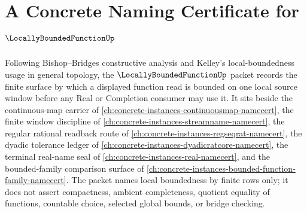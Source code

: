 \chapter{A Concrete Naming Certificate for $\LocallyBoundedFunctionUp$}
\label{ch:concrete-instances-locally-bounded-function-namecert}

Following Bishop--Bridges constructive analysis and Kelley's local-boundedness usage in general topology, the $\LocallyBoundedFunctionUp$ packet records the finite surface by which a displayed function read is bounded on one local source window before any Real or Completion consumer may use it. It sits beside the continuous-map carrier of \autoref{ch:concrete-instances-continuousmap-namecert}, the finite window discipline of \autoref{ch:concrete-instances-streamname-namecert}, the regular rational readback route of \autoref{ch:concrete-instances-regseqrat-namecert}, the dyadic tolerance ledger of \autoref{ch:concrete-instances-dyadicratcore-namecert}, the terminal real-name seal of \autoref{ch:concrete-instances-real-namecert}, and the bounded-family comparison surface of \autoref{ch:concrete-instances-bounded-function-family-namecert}. The packet names local boundedness by finite rows only; it does not assert compactness, ambient completeness, quotient equality of functions, countable choice, selected global bounds, or bridge checking.

